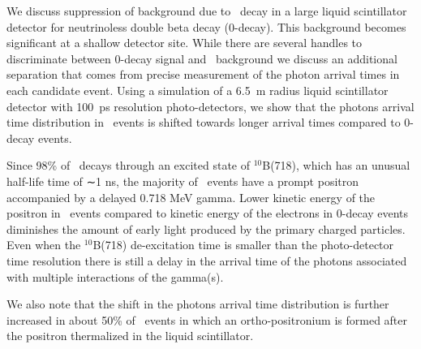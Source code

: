 We discuss suppression of background due to \C~decay in a large liquid scintillator detector
for neutrinoless double beta decay (0\nbb-decay). This background becomes significant at a
shallow detector site. While there are several handles to discriminate between 0\nbb-decay 
signal and \C~background we discuss an additional separation that comes from precise 
measurement of the photon arrival times in each candidate event. Using a simulation of 
a 6.5~m radius liquid scintillator detector with 100~ps resolution photo-detectors, we show
that the photons arrival time distribution in \C~events is shifted towards longer arrival times 
compared to 0\nbb-decay events. 

Since 98\% of \C~decays through an excited state of
$^{10}$B(718), which has an unusual half-life time of ∼1 ns, the majority of \C~events have 
a prompt positron accompanied by a delayed 0.718 MeV gamma.
Lower kinetic energy of the positron in \C~events compared 
to kinetic energy of the electrons in 0\nbb-decay events diminishes the amount of early 
light produced by the primary charged particles. Even when the $^{10}$B(718) de-excitation time 
is smaller than the photo-detector time resolution there is still a delay in the arrival time of
the photons associated with multiple interactions of the gamma(s).

We also note that the shift in the photons arrival time distribution is further increased in about 
50\% of \C~events in which an ortho-positronium is formed after the positron thermalized in the
liquid scintillator.

